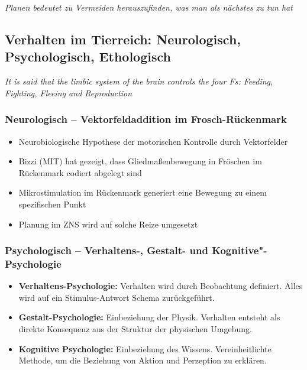 \emph{Planen bedeutet zu Vermeiden herauszufinden, was man als nächstes zu tun hat}
\subsection{Verhalten im Tierreich: Neurologisch, Psychologisch, Ethologisch}
\emph{It is said that the limbic system of the brain controls the four Fs: Feeding, Fighting, Fleeing and Reproduction}
\subsubsection{Neurologisch -- Vektorfeldaddition im Frosch-Rückenmark}
\begin{itemize}
	\item Neurobiologische Hypothese der motorischen Kontrolle durch Vektorfelder
	\item Bizzi (MIT) hat gezeigt, dass Gliedmaßenbewegung in Fröschen im Rückenmark codiert abgelegt sind
	\item Mikrostimulation im Rückenmark generiert eine Bewegung zu einem spezifischen Punkt
	\item Planung im ZNS wird auf solche Reize umgesetzt
\end{itemize}

\subsubsection{Psychologisch -- Verhaltens-, Gestalt- und Kognitive"-Psychologie}
\begin{itemize}
	\item \textbf{Verhaltens-Psychologie:}
	Verhalten wird durch Beobachtung definiert.
	Alles wird auf ein Stimulus-Antwort Schema zurückgeführt.
	\item \textbf{Gestalt-Psychologie:}
	Einbeziehung der Physik.
	Verhalten entsteht als direkte Konsequenz aus der Struktur der physischen Umgebung.
	\item \textbf{Kognitive Psychologie:}
	Einbeziehung des Wissens.
	Vereinheitlichte Methode, um die Beziehung von Aktion und Perzeption zu erklären.
\end{itemize}

